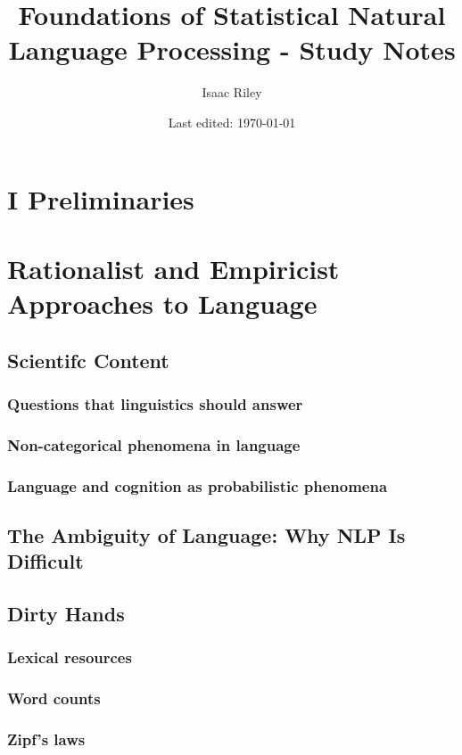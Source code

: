 \documentclass[a4paper]{article}
\title{Foundations of Statistical Natural Language Processing - Study Notes}
\author{Isaac Riley}
\date{Last edited: \today}
\begin{document}
\maketitle
\tableofcontents
\newpage




\section*{I Preliminaries}
\section{Rationalist and Empiricist Approaches to Language}
\subsection{Scientifc Content}
\subsubsection{Questions that linguistics should answer}
\subsubsection{Non-categorical phenomena in language}
\subsubsection{Language and cognition as probabilistic phenomena}
\subsection{The Ambiguity of Language: Why NLP Is Difficult}
\subsection{Dirty Hands}
\subsubsection{Lexical resources}
\subsubsection{Word counts}
\subsubsection{Zipf's laws}
\end{document}
